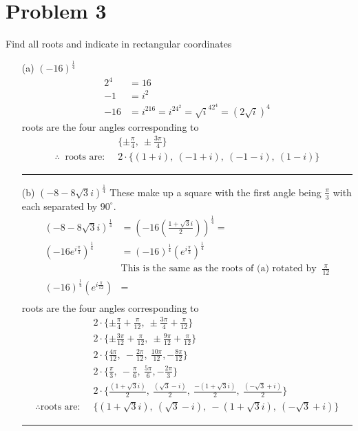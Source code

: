 \documentclass{article}
\begin{document}
\section*{Problem 3}
Find all roots and indicate in rectangular coordinates
\begin{enumerate}
\item[(a)] $(-16)^{\frac{1}{4}}$
  \begin{align*}
    2^{4} &= 16\\
    -1 &= i^2 \\
    -16 &= i^216 = i^24^2 = \sqrt{i}^42^4 = (2\sqrt{i})^4 
  \end{align*}
  roots are the four angles corresponding to
  \begin{align*}
    &\{\pm \frac{\pi}{4},\ \pm \frac{3\pi}{4}\} \\
      \therefore\ \text{ roots are: }\ &2\cdot \{(1+i),\ (-1+i),\ (-1-i),\ (1-i)\}
  \end{align*}
\hrule
\item[(b)] $(-8-8\sqrt{3}i)^{\frac{1}{4}}$
  These make up a square with the first angle being $\frac{\pi}{3}$ with each separated by $90^{\circ}$.
  \begin{align*}
    (-8-8\sqrt{3}i)^{\frac{1}{4}} &= \left(-16\left(\frac{1+\sqrt{3}i}{2}\right)\right)^{\frac{1}{4}} = \\
    (-16e^{i\frac{\pi}{3}})^{\frac{1}{4}} &= (-16)^{\frac{1}{4}}(e^{i\frac{\pi}{3}})^{\frac{1}{4}} \\
                                  &\text{This is the same as the roots of (a) rotated by }\ \frac{\pi}{12}\\
    (-16)^{\frac{1}{4}}(e^{i\frac{\pi}{12}}) &= \\
  \end{align*}
    roots are the four angles corresponding to
  \begin{align*}
    & 2\cdot\{\pm \frac{\pi}{4} + \frac{\pi}{12},\ \pm \frac{3\pi}{4} + \frac{\pi}{12}\} \\
    &2\cdot \{\pm \frac{3\pi}{12} + \frac{\pi}{12},\ \pm \frac{9\pi}{12} + \frac{\pi}{12}\} \\
    &2\cdot \{ \frac{4\pi}{12},\ -\frac{2\pi}{12},\ \frac{10\pi}{12}, -\frac{8\pi}{12}\} \\
    &2\cdot \{ \frac{\pi}{3},\ -\frac{\pi}{6},\ \frac{5\pi}{6}, -\frac{2\pi}{3}\} \\
      &2\cdot \{\frac{(1+\sqrt{3}i)}{2},\ \frac{(\sqrt{3}-i)}{2},\ \frac{-(1+\sqrt{3}i)}{2},\ \frac{(-\sqrt{3}+i)}{2}\}\\
      \therefore \text{roots are: }\ &\{(1+\sqrt{3}i),\ (\sqrt{3}-i),\ -(1+\sqrt{3}i),\ (-\sqrt{3}+i)\}
  \end{align*}

\hrule
\end{enumerate}
\end{document}
